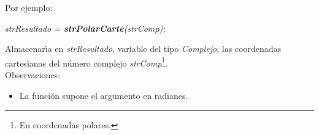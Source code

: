 \newpage

Por ejemplo:

\begin{center}
\emph{strResultado = \textbf{strPolarCarte}(strComp);}
\end{center}

Almacenar\'{\i}a en \emph{strResultado}, variable del tipo \emph{Complejo}, las
coordenadas cartesianas del n\'umero complejo \emph{strComp}\footnote{En 
coordenadas polares.}.\\

Observaciones:

\begin{itemize}
\item La funci\'on supone el argumento en radianes.
\end{itemize}
